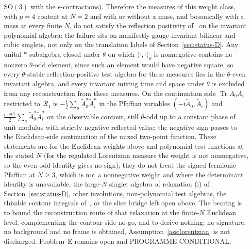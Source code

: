 \(\mathrm{SO}(3)\) with the \(\epsilon\)-contractions). Therefore the measures of
this weight class, with \(p=4\) content at \(N=2\) and with or without a mass, and
bosonically with a mass at every finite \(N\), do not satisfy the reflection
positivity of~\cite{OsterwalderSchrader1973,OsterwalderSchrader1975} on the
invariant polynomial algebra: the failure sits on manifestly gauge-invariant
bilinear and cubic singlets, not only on the translation labels of
Section~\ref{sec:status-D}. Any unital \(*\)-subalgebra closed under \(\theta\) on which \(\langle\cdot,\cdot\rangle_\theta\) is nonnegative contains no nonzero \(\theta\)-odd element, since such an element would have negative square, so every \(\theta\)-stable reflection-positive test algebra for these measures lies in the \(\theta\)-even invariant algebra, and every invariant mixing time and space under \(\theta\) is excluded from any reconstruction from these measures. On the
continuation side \(\operatorname{Tr}A_0A_i\) restricted to \(\mathcal R_1\) is
\(-\frac{\mathrm i}2\sum_a\tilde A^a_0\tilde A^a_i\) in the Pfaffian variables
\((-\mathrm i\tilde A_0,\tilde A_i)\) and \(\frac{\mathrm e^{-\pi\mathrm
i/4}}2\sum_a\tilde A^a_0\tilde A^a_i\) on the observable contour, still
\(\theta\)-odd up to a constant phase of unit modulus with strictly negative
reflected value: the negative sign passes to the Euclidean-side continuation of the
mixed two-point function. These statements are for the Euclidean weights above and
polynomial test functions at the stated \(N\) (for the regulated Lorentzian measure
the weight is not nonnegative, so the even-odd identity gives no sign); they do not
treat the signed fermionic Pfaffian at \(N\ge3\), which is not a nonnegative weight
and where the determinant identity is unavailable, the large-\(N\) singlet algebra
of relaxation (i) of Section~\ref{sec:status-D}, other involutions, non-polynomial
test algebras, the thimble contour integrals of~\cite{ChouNishimuraTripathi2025}, or
the slice bridge left open above. The bearing is to bound the reconstruction route
of that relaxation at the finite-\(N\) Euclidean level, complementing the
contour-side no-go, and to derive nothing: no signature, no background and no frame
is obtained, Assumption~\ref{ass:lorentzian} is not discharged. Problem~E remains
open and PROGRAMME-CONDITIONAL.




